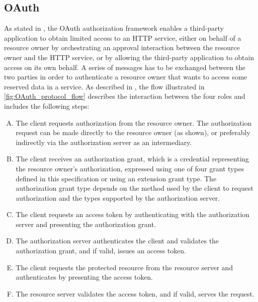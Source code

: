 \subsection{OAuth}
As stated in \cite{ietf_oauth2}, the \gls{OAuth} authorization framework enables a third-party application to obtain limited access to an HTTP service, either on behalf of a resource owner by orchestrating an approval interaction between the resource owner and the HTTP service, or by allowing the third-party application to obtain access on its own behalf.
A series of messages has to be exchanged between the two parties in order to authenticate a resource owner that wants to access some reserved data in a service. As described in \cite{ietf_oauth2}, the flow illustrated in \ref{fig:OAuth_protocol_flow} describes the interaction between the four roles and includes the following steps:
\begin{enumerate}[(A)]
    \item The client requests authorization from the resource owner.  The authorization request can be made directly to the resource owner (as shown), or preferably indirectly via the authorization server as an intermediary.
    \item The client receives an authorization grant, which is a credential representing the resource owner's authorization, expressed using one of four grant types defined in this specification or using an extension grant type. The authorization grant type depends on the method used by the client to request authorization and the types supported by the authorization server.
    \item The client requests an access token by authenticating with the authorization server and presenting the authorization grant.
    \item The authorization server authenticates the client and validates the authorization grant, and if valid, issues an access token.
    \item The client requests the protected resource from the resource server and authenticates by presenting the access token.
    \item The resource server validates the access token, and if valid, serves the request.
\end{enumerate}
 
